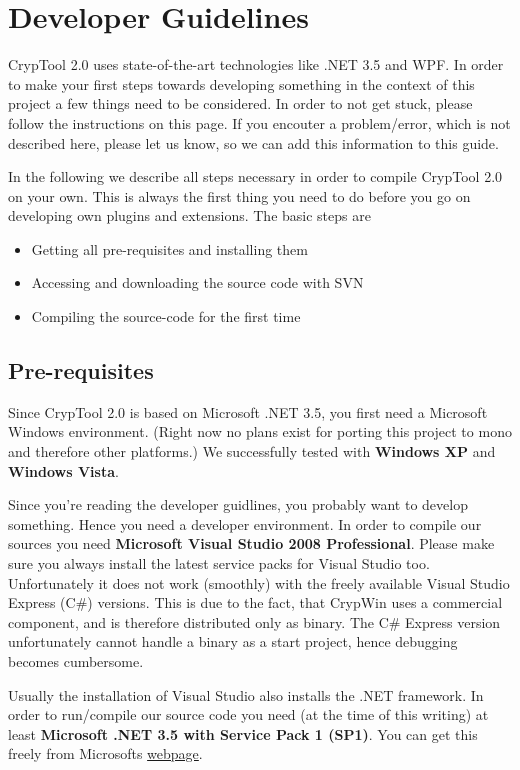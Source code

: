 \chapter{Developer Guidelines}

CrypTool 2.0 uses state-of-the-art technologies like .NET 3.5 and WPF. In order to make your first steps towards developing something in the context of this project a few things need to be considered. In order to not get stuck, please follow the instructions on this page. If you encouter a problem/error, which is not described here, please let us know, so we can add this information to this guide.

In the following we describe all steps necessary in order to compile CrypTool 2.0 on your own. This is always the first thing you need to do before you go on developing own plugins and extensions. The basic steps are
\begin{itemize}
	\item Getting all pre-requisites and installing them
	\item Accessing and downloading the source code with SVN
	\item Compiling the source-code for the first time
\end{itemize}

\section{Pre-requisites}

Since CrypTool 2.0 is based on Microsoft .NET 3.5, you first need a Microsoft Windows environment. (Right now no plans exist for porting this project to mono and therefore other platforms.) We successfully tested with \textbf{Windows XP} and \textbf{Windows Vista}.

Since you're reading the developer guidlines, you probably want to develop something. Hence you need a developer environment. In order to compile our sources you need \textbf{Microsoft Visual Studio 2008 Professional}. Please make sure you always install the latest service packs for Visual Studio too. Unfortunately it does not work (smoothly) with the freely available Visual Studio Express (C\#) versions. This is due to the fact, that CrypWin uses a commercial component, and is therefore distributed only as binary. The C\# Express version unfortunately cannot handle a binary as a start project, hence debugging becomes cumbersome.

Usually the installation of Visual Studio also installs the .NET framework. In order to run/compile our source code you need (at the time of this writing) at least \textbf{Microsoft .NET 3.5 with Service Pack 1 (SP1)}. You can get this freely from Microsofts \href{http://download.microsoft.com/download/2/0/e/20e90413-712f-438c-988e-fdaa79a8ac3d/dotnetfx35.exe}{webpage}.

